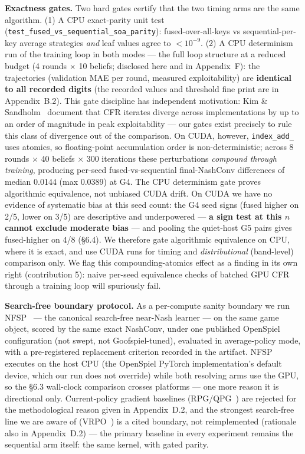 \documentclass[11pt]{article}
\begin{document}
\textbf{Exactness gates.} Two hard gates certify that the two timing arms are the same
algorithm. (1) A CPU exact-parity unit test
(\texttt{test\_fused\_vs\_sequential\_soa\_parity}): fused-over-all-keys vs
sequential-per-key average strategies \emph{and} leaf values agree to $<10^{-9}$. (2) A
CPU determinism run of the training loop in both modes --- the full loop structure at a
reduced budget (4 rounds $\times$ 10 beliefs; disclosed here and in Appendix~F): the
trajectories (validation MAE per round, measured exploitability) are \textbf{identical
to all recorded digits} (the recorded values and threshold fine print are in
Appendix~B.2). This gate discipline has independent motivation: Kim \&
Sandholm~\citep[App.~D]{KimSandholm2026}
document that CFR iterates diverge across implementations by up to an order of magnitude
in peak exploitability --- our gates exist precisely to rule this class of divergence
out of the comparison. On CUDA, however, \texttt{index\_add\_} uses atomics, so floating-point
accumulation order is non-deterministic; across 8 rounds $\times$ 40 beliefs $\times$
300 iterations these perturbations \emph{compound through training}, producing per-seed
fused-vs-sequential final-NashConv differences of median 0.0144 (max 0.0389) at G4. The
CPU determinism gate proves algorithmic equivalence, not unbiased CUDA drift. On CUDA we
have no evidence of systematic bias at this seed count: the G4 seed signs (fused higher
on 2/5, lower on 3/5) are descriptive and underpowered --- \textbf{a sign test at this
$n$ cannot exclude moderate bias} --- and pooling the quiet-host G5 pairs
gives fused-higher on 4/8 (\S6.4). We therefore gate algorithmic equivalence on CPU,
where it is exact, and use CUDA runs for timing and \emph{distributional} (band-level)
comparison only. We flag this
compounding-atomics effect as a finding in its own right (contribution 5): naive
per-seed equivalence checks of batched GPU CFR through a training loop will spuriously
fail.

\textbf{Search-free boundary protocol.} As a per-compute sanity boundary we run
NFSP~\citep{HeinrichSilver2016} --- the canonical search-free near-Nash learner --- on
the same game object, scored by the same exact NashConv, under one published OpenSpiel
configuration (not swept, not Goofspiel-tuned), evaluated in average-policy mode, with a
pre-registered replacement criterion recorded in the artifact. NFSP executes on the host
CPU (the OpenSpiel PyTorch implementation's default device, which our run does not
override) while both resolving arms use the GPU, so the \S6.3 wall-clock comparison
crosses platforms --- one more reason it is directional only. Current-policy gradient
baselines (RPG/QPG~\citep{Srinivasan2018}) are rejected for the methodological reason
given in Appendix~D.2, and the strongest search-free line we are aware of
(VRPO~\citep{VRPO}) is a cited boundary, not reimplemented (rationale also in
Appendix~D.2) --- the primary baseline in every experiment remains the sequential
arm itself: the same kernel, with gated parity.
\end{document}
